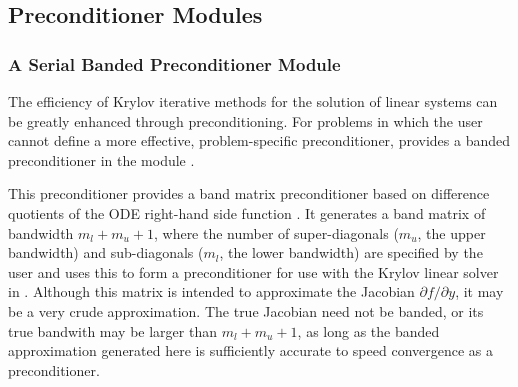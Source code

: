 \subsection{{\cvodes} Preconditioner Modules}\label{ss:preconds}

\subsubsection{A Serial Banded Preconditioner Module}\label{sss:cvbandpre}

The efficiency of Krylov iterative methods for the solution of linear systems 
can be greatly enhanced through preconditioning. For problems in which the 
user cannot define a more effective, problem-specific preconditioner,
{\cvodes} provides a banded preconditioner in the module {\cvbandpre}.

This preconditioner provides a band matrix preconditioner based on
difference quotients of the ODE right-hand side function .
It generates a band matrix of bandwidth $m_l + m_u + 1$, where
the number of super-diagonals ($m_u$, the upper bandwidth) and
sub-diagonals ($m_l$, the lower bandwidth) are specified by
the user and uses this to form a preconditioner for use with the Krylov
linear solver in {\cvspgmr}.  Although this matrix is intended
to approximate the Jacobian $\partial f / \partial y$, 
it may be a very crude approximation.  The true Jacobian need not be banded, or its
true bandwith may be larger than $m_l + m_u + 1$, as long as the
banded approximation generated here is sufficiently accurate
to speed convergence as a preconditioner. 

